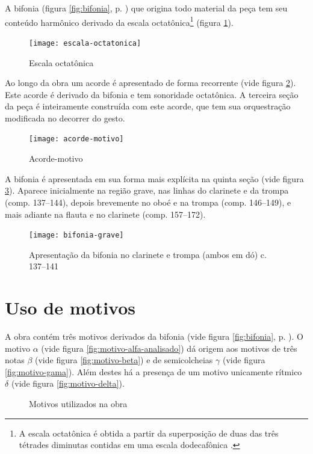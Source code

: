 A bifonia (figura \ref{fig:bifonia}, p. \pageref{fig:bifonia}) que
origina todo material da peça tem seu conteúdo harmônico derivado da
escala octatônica\footnote{A escala octatônica é obtida a partir da
  superposição de duas das três tétrades diminutas contidas em uma
  escala dodecafônica \cite[p. 76]{antokoletz90:music}.} (figura
\ref{fig:escala-octatonica}).

\begin{figure}
  \centering
  \texttt{[image: escala-octatonica]}
  \caption{Escala octatônica}
  \label{fig:escala-octatonica}
\end{figure}

Ao longo da obra um acorde é apresentado de forma recorrente (vide
figura \ref{fig:acorde-motivo}). Este acorde é derivado da bifonia e
tem sonoridade octatônica. A terceira seção da peça é inteiramente
construída com este acorde, que tem sua orquestração modificada no
decorrer do gesto.

\begin{figure}
  \centering
  \texttt{[image: acorde-motivo]}
  \caption{Acorde-motivo}
  \label{fig:acorde-motivo}
\end{figure}

A bifonia é apresentada em sua forma mais explícita na quinta seção
(vide figura \ref{fig:bifonia-grave}). Aparece inicialmente na região
grave, nas linhas do clarinete e da trompa (comp. 137--144), depois
brevemente no oboé e na trompa (comp. 146--149), e mais adiante na
flauta e no clarinete (comp. 157--172).

\begin{figure}
  \centering
  \texttt{[image: bifonia-grave]}
  \caption{Apresentação da bifonia no clarinete e trompa (ambos em
    dó) c. 137--141}
  \label{fig:bifonia-grave}
\end{figure}
\section{Uso de motivos}
\label{sec:uso-de-motivos}

A obra contém três motivos derivados da bifonia (vide figura
\ref{fig:bifonia}, p. \pageref{fig:bifonia}). O motivo $\alpha$ (vide
figura \ref{fig:motivo-alfa-analisado}) dá origem aos motivos de três
notas $\beta$ (vide figura \ref{fig:motivo-beta}) e de semicolcheias
$\gamma$ (vide figura \ref{fig:motivo-gama}). Além destes há a
presença de um motivo unicamente rítmico $\delta$ (vide figura
\ref{fig:motivo-delta}).

\begin{figure}
  \centering


  \caption{Motivos utilizados na obra}
  \label{fig:motivos-utilizados}
\end{figure}

